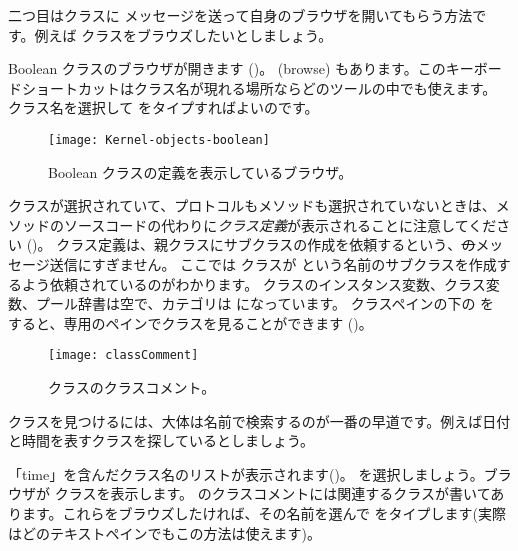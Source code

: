 \documentclass[a4paper,10pt,twoside]{book}
\begin{document}
二つ目はクラスに  メッセージを送って自身のブラウザを開いてもらう方法です。例えば クラスをブラウズしたいとしましょう。

Boolean クラスのブラウザが開きます ()。
  (browse) もあります。このキーボードショートカットはクラス名が現れる場所ならどのツールの中でも使えます。
クラス名を選択して  をタイプすればよいのです。


\begin{figure}[hbt]
\centerline {\texttt{[image: Kernel-objects-boolean]}}
\caption{Boolean クラスの定義を表示しているブラウザ。
}
\end{figure}

 クラスが選択されていて、プロトコルもメソッドも選択されていないときは、メソッドのソースコードの代わりに\emph{クラス定義}が表示されることに注意してください ()。
クラス定義は、親クラスにサブクラスの作成を依頼するという、\st のメッセージ送信にすぎません。
ここでは  クラスが  という名前のサブクラスを作成するよう依頼されているのがわかります。 クラスのインスタンス変数、クラス変数、プール辞書は空で、カテゴリは になっています。
クラスペインの下の  を \click すると、専用のペインでクラスを見ることができます ()。

\begin{figure}[hbt]
\centerline {\texttt{[image: classComment]}}
\caption{ クラスのクラスコメント。
}
\end{figure}

クラスを見つけるには、大体は名前で検索するのが一番の早道です。例えば日付と時間を表すクラスを探しているとしましょう。

\noindent
「time」を含んだクラス名のリストが表示されます()。 を選択しましょう。ブラウザが  クラスを表示します。 のクラスコメントには関連するクラスが書いてあります。これらをブラウズしたければ、その名前を選んで  をタイプします(実際はどのテキストペインでもこの方法は使えます)。
\end{document}
